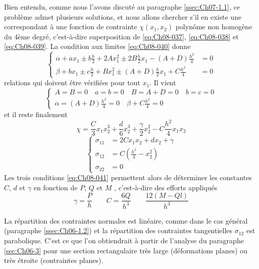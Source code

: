 Bien entendu, comme nous l'avons discuté au paragraphe \ref{ssec:Ch07-1.1}, ce problème admet plusieurs solutions, et nous allons chercher s'il en existe une correspondant à une fonction de contrainte $\chi(x_1,x_2)$ polynôme non homogène du 4ème degré, c'est-à-dire superposition de \eqref{eq:Ch08-037}, \eqref{eq:Ch08-038} et \eqref{eq:Ch08-039}.
La condition aux limites \eqref{eq:Ch08-040} donne 
\begin{equation}
  \left\{
  \begin{aligned}
    \alpha +a x_1 \pm b \frac{h}{2} + 2 A x_1^2 \pm 2 B \frac{h}{2} x_1 - (A+D)\frac{h^2}{4} & = 0 \\
    \beta +b x_1 \pm c \frac{h}{2} + B x_1^2 \pm (A+D) \frac{h}{2} x_1 + C \frac{h^2}{4}&=0
  \end{aligned}
  \right.
    \label{eq:Ch08-042}
\end{equation}
relations qui doivent être vérifiées pour tout $x_1$.
Il vient
\begin{equation}
  \left\{
  \begin{aligned}
    A = B = 0 \quad a = b =0 \quad B = A+D =0 \quad b = c =0\\
    \alpha=(A+D)\frac{h^2}{4}=0 \quad \beta + C \frac{h^2}{4} =0
  \end{aligned}
  \right.
    \label{eq:Ch08-043}
\end{equation}
et il reste finalement
\begin{equation}
  \chi = \frac{C}{3} x_1 x_2^3 + \frac{d}{6} x_2^3 +\frac{\gamma}{2} x_2^2 - C\frac{h^2}{4} x_1 x_2
    \label{eq:Ch08-044}
\end{equation}
\begin{equation}
  \left\{
  \begin{aligned}
    \sigma_{11} & = 2 C x_1 x_2 + d x_2 + \gamma \\
    \sigma_{12} & = C (\frac{h^2}{4} - x_2^2) \\
    \sigma_{22} & = 0
  \end{aligned}
  \right.
    \label{eq:Ch08-045}
\end{equation}
Les trois conditions \eqref{eq:Ch08-041} permettent alors de déterminer les constantes $C$, $d$ et $\gamma$ en fonction de $P$, $Q$ et $M$ , c'est-à-dire des efforts appliqués 
\begin{equation}
  \gamma = \frac{P}{h} \qquad C = \frac{6Q}{h^3} \qquad \frac{12(M-Ql)}{h^3}
    \label{eq:Ch08-044}
\end{equation}

La répartition des contraintes normales est linéaire, comme dans le cas général (paragraphe \ref{ssec:Ch06-1.2}) et la répartition des contraintes tangentielles $\sigma_{12}$ est parabolique. C'est ce que l'on obtiendrait à partir de l'analyse du paragraphe \ref{sec:Ch06-3} pour une section rectangulaire très large (déformations planes) ou très étroite (contraintes planes). 

